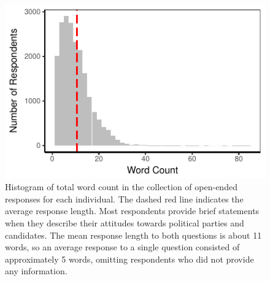 \documentclass[12pt]{article}
\begin{document}
\begin{figure}[h]\centering
\includegraphics{../fig/swiss_wc.pdf}
\caption{Histogram of total word count in the collection of open-ended responses for each individual. The dashed red line indicates the average response length. Most respondents provide brief statements when they describe their attitudes towards political parties and candidates. The mean response length to both questions is about 11 words, so an average response to a single question consisted of approximately 5 words, omitting respondents who did not provide any information.}\label{fig:swiss_wc}
\end{figure}
\end{document}
